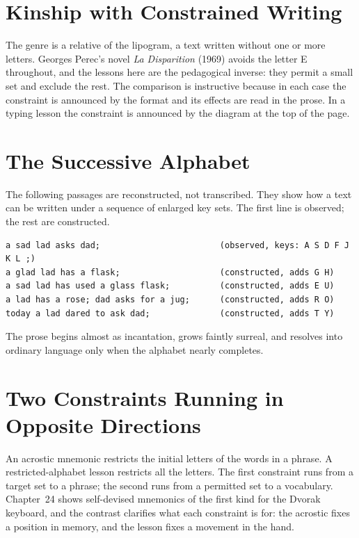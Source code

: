 \section{Kinship with Constrained Writing}

The genre is a relative of the lipogram, a text written without one or more letters. Georges Perec's novel \emph{La Disparition} (1969) avoids the letter E throughout, and the lessons here are the pedagogical inverse: they permit a small set and exclude the rest. The comparison is instructive because in each case the constraint is announced by the format and its effects are read in the prose. In a typing lesson the constraint is announced by the diagram at the top of the page.

\section{The Successive Alphabet}

The following passages are reconstructed, not transcribed. They show how a text can be written under a sequence of enlarged key sets. The first line is observed; the rest are constructed.

\begin{Verbatim}[label=QWERTY, labelposition=topline]
a sad lad asks dad;                        (observed, keys: A S D F J K L ;)
a glad lad has a flask;                    (constructed, adds G H)
a sad lad has used a glass flask;          (constructed, adds E U)
a lad has a rose; dad asks for a jug;      (constructed, adds R O)
today a lad dared to ask dad;              (constructed, adds T Y)
\end{Verbatim}

The prose begins almost as incantation, grows faintly surreal, and resolves into ordinary language only when the alphabet nearly completes.

\section{Two Constraints Running in Opposite Directions}

An acrostic mnemonic restricts the initial letters of the words in a phrase. A restricted-alphabet lesson restricts all the letters. The first constraint runs from a target set to a phrase; the second runs from a permitted set to a vocabulary. Chapter~24 shows self-devised mnemonics of the first kind for the Dvorak keyboard, and the contrast clarifies what each constraint is for: the acrostic fixes a position in memory, and the lesson fixes a movement in the hand.

